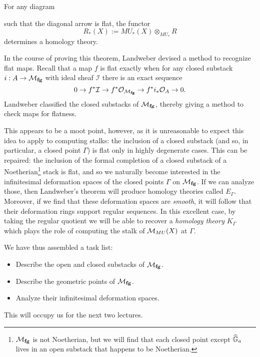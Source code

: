 \begin{theorem}[Landweber]
For any diagram
\begin{center}
\end{center}
such that the diagonal arrow is flat, the functor \[R_*(X) := MU_*(X) \otimes_{MU_*} R\] determines a homology theory. 
\end{theorem}

\noindent In the course of proving this theorem, Landweber devised a method to recognize flat maps.  Recall that a map $f$ is flat exactly when for any closed substack $i: A \to \mathcal{M}_{\mathbf{fg}}$ with ideal sheaf $\mathcal I$ there is an exact sequence \[0 \to f^* \mathcal I \to f^* \mathcal O_{\mathcal{M}_{\mathbf{fg}}} \to f^* i_* \mathcal O_A \to 0.\]  Landweber classified the closed substacks of $\mathcal{M}_{\mathbf{fg}}$, thereby giving a method to check maps for flatness.

This appears to be a moot point, however, as it is unreasonable to expect this idea to apply to computing stalks: the inclusion of a closed substack (and so, in particular, a closed point $\Gamma$) is flat only in highly degenerate cases.  This can be repaired: the inclusion of the formal completion of a closed substack of a Noetherian\footnote{$\mathcal{M}_{\mathbf{fg}}$ is not Noetherian, but we will find that each closed point except $\widehat{\mathbb G}_a$ lives in an open substack that happens to be Noetherian.} stack is flat, and so we naturally become interested in the infinitesimal deformation spaces of the closed points $\Gamma$ on $\mathcal{M}_{\mathbf{fg}}$.  If we can analyze those, then Landweber's theorem will produce homology theories called $E_\Gamma$.  Moreover, if we find that these deformation spaces are \emph{smooth}, it will follow that their deformation rings support regular sequences.  In this excellent case, by taking the regular quotient we will be able to recover a \emph{homology theory} $K_\Gamma$ which plays the role of computing the stalk of $\mathcal{M}_{MU}(X)$ at $\Gamma$.

We have thus assembled a task list:
\begin{itemize}
\item Describe the open and closed substacks of $\mathcal{M}_{\mathbf{fg}}$.
\item Describe the geometric points of $\mathcal{M}_{\mathbf{fg}}$.
\item Analyze their infinitesimal deformation spaces.
\end{itemize}
This will occupy us for the next two lectures.

